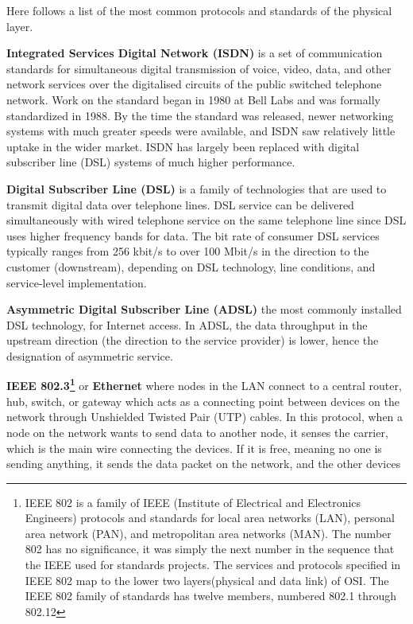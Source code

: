Here follows a list of the most common protocols and standards of the physical layer.
\bit
\item \textbf{Integrated Services Digital Network (ISDN)} is a set of communication standards for simultaneous
digital transmission of voice, video, data, and other network services over the digitalised circuits of the public
switched telephone network. Work on the standard began in 1980 at Bell Labs and was formally standardized in 1988. By
the time the standard was released, newer networking systems with much greater speeds were available, and ISDN saw
relatively little uptake in the wider market. ISDN has largely been replaced with digital subscriber line (DSL)
systems of much higher performance.
\item \textbf{Digital Subscriber Line (DSL)} is a family of technologies that are used to transmit digital data over
telephone lines. DSL service can be delivered simultaneously with wired telephone service on the same telephone line
since DSL uses higher frequency bands for data. The bit rate of consumer DSL services typically ranges from 256
kbit/s to over 100 Mbit/s in the direction to the customer (downstream), depending on DSL technology, line
conditions, and service-level implementation.
\item \textbf{Asymmetric Digital Subscriber Line (ADSL)} the most commonly installed DSL technology, for Internet
access. In ADSL, the data throughput in the upstream direction (the direction to the service provider) is lower,
hence the designation of asymmetric service.
\item \textbf{IEEE 802.3\footnote{IEEE 802 is a family of IEEE (Institute of Electrical and Electronics Engineers)
protocols and standards for local area networks (LAN), personal area network (PAN), and metropolitan area networks
(MAN). The number 802 has no significance, it was simply the next number in the sequence that the IEEE used for
standards projects. The services and protocols specified in IEEE 802 map to the lower two layers(physical and data
link) of OSI. The IEEE 802 family of standards has twelve members, numbered 802.1 through 802.12}} or \textbf{
Ethernet} where nodes in the LAN connect to a central router, hub, switch, or gateway which acts as a connecting
point between devices on the network through Unshielded Twisted Pair (UTP) cables. In this protocol, when a node on
the network wants to send data to another node, it senses the carrier, which is the main wire connecting the devices.
If it is free, meaning no one is sending anything, it sends the data packet on the network, and the other devices
